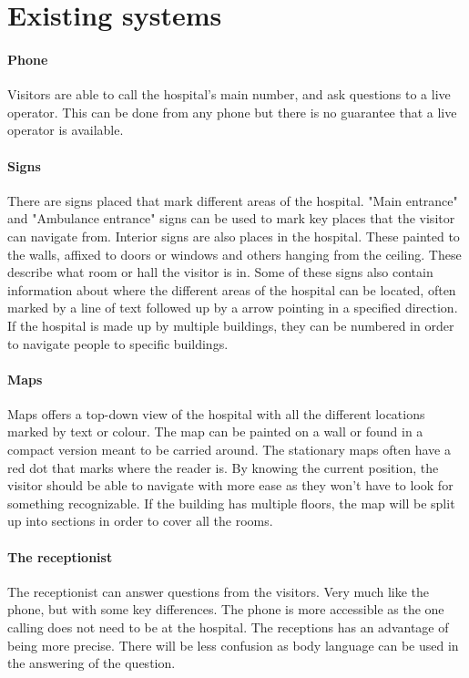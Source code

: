 \section{Existing systems} %
\label{sec:existing_systems}


\paragraph{Phone}
Visitors are able to call the hospital's main number, and ask questions to a live operator. This can be done from any phone but there is no guarantee that a live operator is available.

\paragraph{Signs}
There are signs placed that mark different areas of the hospital. "Main entrance" and "Ambulance entrance" signs can be used to mark key places that the visitor can navigate from\cite{art_Osborne}.
Interior signs are also places in the hospital. These painted to the walls, affixed to doors or windows and others hanging from the ceiling. These describe what room or hall the visitor is in. Some of these signs also contain information about where the different areas of the hospital can be located, often marked by a line of text followed up by a arrow pointing in a specified direction. If the hospital is made up by multiple buildings, they can be numbered in order to navigate people to specific buildings.

\paragraph{Maps}
Maps offers a top-down view of the hospital with all the different locations marked by text or colour\cite{art_Osborne}. The map can be painted on a wall or found in a compact version meant to be carried around. The stationary maps often have a red dot that marks where the reader is. By knowing the current position, the visitor should be able to navigate with more ease as they won't have to look for something recognizable. If the building has multiple floors, the map will be split up into sections in order to cover all the rooms.

\paragraph{The receptionist}
The receptionist can answer questions from the visitors. Very much like the phone, but with some key differences. The phone is more accessible as the one calling does not need to be at the hospital. The receptions has an advantage of being more precise. There will be less confusion as body language can be used in the answering of the question.


